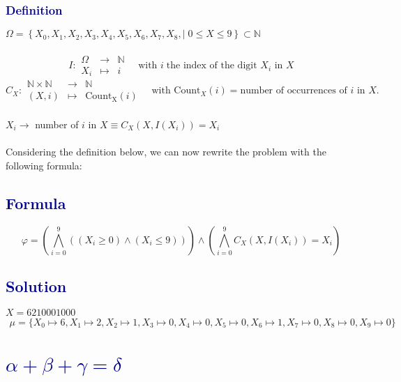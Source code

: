 \documentclass[12pt]{article}
\theoremstyle{definition}
\theoremstyle{plain}
\begin{document}
\subsubsection*{\textcolor{darkblue}{Definition}}
$  \Omega = \left\{X_0, X_1, X_2, X_3, X_4, X_5, X_6, X_7, X_8, |\; 0\leq X \leq 9 \right\} \subset  \mathbb{N}$\\\\
\[
  I:
  \begin{array}{rcl}
    \Omega & \longrightarrow & \mathbb{N} \\
    X_i & \longmapsto & i
  \end{array}
  \quad \text{with } i \; \text{the index of the digit } X_i \text{ in } X
\]
\[
  C_X:
  \begin{array}{rcl}
    \mathbb{N}\times \mathbb{N} & \longrightarrow & \mathbb{N}\\
    (X, i) & \longmapsto & \mathrm{Count_X}(i)
  \end{array}
  \quad \text{with } \mathrm{Count}_X(i) = \text{number of occurrences of } i \text{ in } X.
\]
\\
$X_i \rightarrow$ number of $i$ in $X \equiv C_X(X,I(X_i)) = X_i$\\\\
Considering the definition below, we can now rewrite the problem with the following formula:
\subsection*{\textcolor{darkblue}{Formula}}
\begin{equation}
\varphi = \left(\bigwedge^9_{i=0}((X_i \geq 0)\wedge(X_i \leq 9))\right)
         \wedge \left(\bigwedge_{i=0}^9 C_X(X, I(X_i)) = X_i\right)
\end{equation}

\subsection*{\textcolor{darkblue}{Solution}}
$X = 6210001000$
\[
\boxed{\begin{aligned}
\mu = \{X_0 \mapsto 6, X_1 \mapsto 2, X_2 \mapsto 1, X_3 \mapsto 0, X_4 \mapsto 0, X_5 \mapsto 0, X_6 \mapsto 1, X_7 \mapsto 0, X_8 \mapsto 0, X_9 \mapsto 0 \}
\end{aligned}}
\]

\section*{\textcolor{darkblue}{$\alpha + \beta + \gamma = \delta$}}
\end{document}
